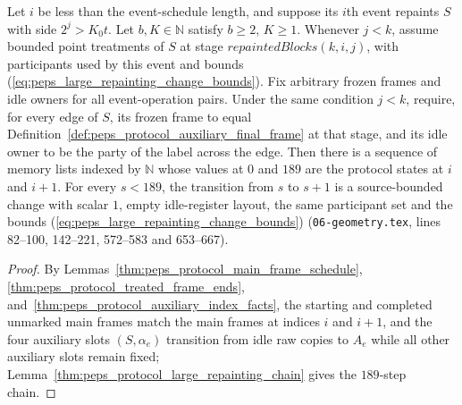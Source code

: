 \begin{lemma}
    Let $i$ be less than the event-schedule length, and suppose its $i$th
    event repaints $S$ with side $2^j>K_0t$. Let $b,K\in\mathbb N$ satisfy
    $b\ge2$, $K\ge1$. Whenever $j<k$, assume bounded point
    treatments of $S$ at stage $\mathit{repaintedBlocks}(k,i,j)$, with
    participants used by this event and bounds
    (\ref{eq:peps_large_repainting_change_bounds}). Fix arbitrary frozen
    frames and idle owners for all event-operation pairs. Under the same
    condition $j<k$, require, for every edge of $S$, its frozen frame to equal
    Definition~\ref{def:peps_protocol_auxiliary_final_frame} at that stage,
    and its idle owner to be the party of the label across the edge.
    Then there is a sequence of memory lists indexed by $\mathbb N$ whose
    values at $0$ and $189$ are the protocol states at $i$ and $i+1$.
    For every $s<189$, the transition from $s$ to $s+1$ is a source-bounded
    change with scalar $1$, empty idle-register layout, the same participant set
    and the bounds (\ref{eq:peps_large_repainting_change_bounds})
    (\texttt{06-geometry.tex}, lines 82--100, 142--221, 572--583 and 653--667).
\end{lemma}

\begin{proof}\leanok
    By Lemmas~\ref{thm:peps_protocol_main_frame_schedule}, \ref{thm:peps_protocol_treated_frame_ends}, and~\ref{thm:peps_protocol_auxiliary_index_facts}, the starting and completed unmarked main frames match the main frames at indices $i$ and $i+1$, and the four auxiliary slots $(S,\alpha_e)$ transition from idle raw copies to $A_e$ while all other auxiliary slots remain fixed; Lemma~\ref{thm:peps_protocol_large_repainting_chain} gives the $189$-step chain.
\end{proof}

